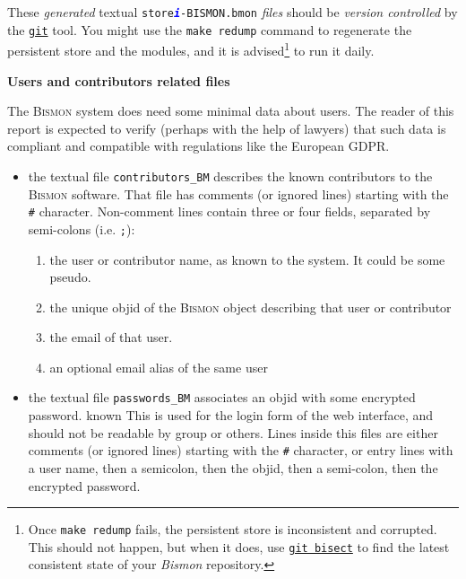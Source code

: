 \begin{appendices}
\begin{itemize}
\end{itemize}

These \emph{generated} textual
\texttt{store\textcolor{blue}{\textit{\textbf{i}}}-BISMON.bmon} \emph{files}
should be \emph{version controlled} by the
\href{https://git-scm.com/}{\texttt{git}} tool. You might use the \texttt{make
  redump} command to regenerate the persistent store and the modules,
and it is advised\footnote{Once \texttt{make redump} fails, the
  persistent store is inconsistent and corrupted. This should not
  happen, but when it does, use
  \href{https://git-scm.com/docs/git-bisect}{\texttt{git bisect}} to
  find the latest consistent state of your \textit{Bismon} repository.}
to run it daily.
  
{\large \textbf{Users and contributors related files}}

The \textsc{Bismon} system does need some minimal data about
users. The reader of this report is expected to verify (perhaps with
the help of lawyers) that such data is compliant and compatible with
regulations like the European  GDPR.

\begin{itemize}
\item the textual file \texttt{contributors\_BM} describes the
  known
  contributors to the \textsc{Bismon} software. That file has comments
  (or ignored lines) starting with the \texttt{\#}
  character. Non-comment lines contain three or four fields, separated
  by semi-colons (i.e. \texttt{;}):

  \begin{enumerate}
  \item the user or contributor name, as known to the system. It could be some pseudo.
  \item the unique objid of the \textsc{Bismon} object describing that user or contributor
  \item the email of that user.
  \item an optional email alias of the same user
  \end{enumerate}


\item the textual file \texttt{passwords\_BM} associates an objid with
  some encrypted password.
  known This is used
  for the login form of the web interface, and should not be readable
  by group or others. Lines inside this files are either comments (or
  ignored lines) starting with the \texttt{\#} character, or entry
  lines with a user name, then a semicolon, then the objid, then a
  semi-colon, then the encrypted password.


\end{itemize}
\end{appendices}
